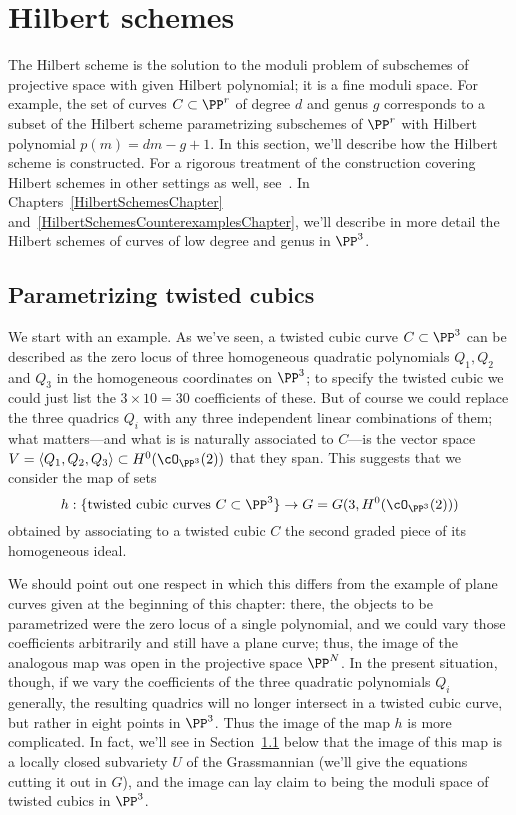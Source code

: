 \section{Hilbert schemes}\label{hilbert scheme section}

The Hilbert scheme is the solution to the moduli problem of subschemes of projective space with given Hilbert polynomial; it is a fine moduli space. For example, the set of curves $C \subset \PP^r$ of degree $d$ and genus $g$ corresponds to a subset of the Hilbert scheme parametrizing subschemes of $\PP^r$ with Hilbert polynomial $p(m) = dm - g + 1$. In this section, we'll describe how the Hilbert scheme is constructed. For a rigorous treatment of the construction covering Hilbert
schemes in other settings as well, see~\cite{HomogHilbert}. In Chapters~\ref{HilbertSchemesChapter} and~\ref{HilbertSchemesCounterexamplesChapter}, we'll describe in more detail the Hilbert schemes of curves of low degree and genus in $\PP^3$. 

\subsection{Parametrizing twisted cubics} We  start with an example. As we've seen, a twisted cubic curve $C \subset \PP^3$ can be described as the zero locus of three homogeneous quadratic polynomials $Q_1, Q_2$ and $Q_3$ in the homogeneous coordinates on $\PP^3$; to specify the twisted cubic we could just list the $3 \times 10 = 30$ coefficients of these. But of course we could replace the three quadrics $Q_i$ with any three independent linear combinations of them; what matters---and what is is naturally associated to $C$---is the vector space $V = \langle Q_1, Q_2, Q_3 \rangle \subset H^0(\cO_{\PP^3}(2))$ that they span. This suggests that we consider the map of sets
$$
h : \{ \text{twisted cubic curves } C \subset \PP^3 \} \to G = G(3, H^0(\cO_{\PP^3}(2)))
$$
obtained by associating to a twisted cubic $C$ the second graded piece of its homogeneous ideal. 

We should point out one respect in which this differs from the example of plane curves given at the beginning of this chapter: there, the objects to be parametrized were the zero locus of a single polynomial, and we could vary those coefficients arbitrarily and still have a plane curve; thus, the image of the analogous map was open in the projective space $\PP^N$. In the present situation, though, if we vary the coefficients of the three quadratic polynomials $Q_i$ generally, the resulting quadrics will no longer intersect in a twisted cubic curve, but rather in eight points in $\PP^3$. Thus the image of the map $h$ is more complicated.
In fact, we'll see in Section~\ref{} below that the image of this map is a locally closed subvariety $U$ of the Grassmannian (we'll give the equations cutting it out in $G$), and the image can lay claim to being the moduli space of twisted cubics in $\PP^3$.


